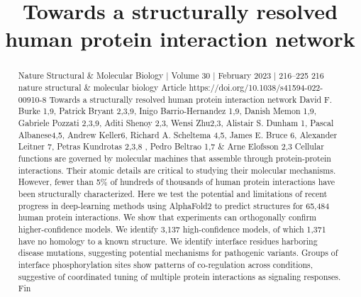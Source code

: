 \title{Towards a structurally resolved human protein interaction network}

\maketitle

\begin{abstract}
Nature Structural \& Molecular Biology | Volume 30 | February 2023 | 216–225 216 nature structural \& molecular biology Article https://doi.org/10.1038/s41594-022-00910-8 Towards a structurally resolved human protein interaction network David F. Burke 1,9, Patrick Bryant 2,3,9, Inigo Barrio-Hernandez 1,9, Danish Memon 1,9, Gabriele Pozzati 2,3,9, Aditi Shenoy 2,3, Wensi Zhu2,3, Alistair S. Dunham 1, Pascal Albanese4,5, Andrew Keller6, Richard A. Scheltema 4,5, James E. Bruce 6, Alexander Leitner 7, Petras Kundrotas 2,3,8 , Pedro Beltrao 1,7 \& Arne Elofsson 2,3 Cellular functions are governed by molecular machines that assemble through protein-protein interactions. Their atomic details are critical to studying their molecular mechanisms. However, fewer than 5\% of hundreds of thousands of human protein interactions have been structurally characterized. Here we test the potential and limitations of recent progress in deep-learning methods using AlphaFold2 to predict structures for 65,484 human protein interactions. We show that experiments can orthogonally confirm higher-confidence models. We identify 3,137 high-confidence models, of which 1,371 have no homology to a known structure. We identify interface residues harboring disease mutations, suggesting potential mechanisms for pathogenic variants. Groups of interface phosphorylation sites show patterns of co-regulation across conditions, suggestive of coordinated tuning of multiple protein interactions as signaling responses. Fin
\end{abstract}

